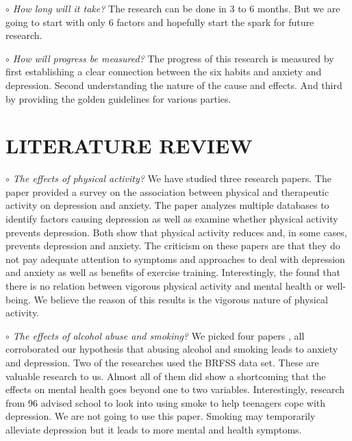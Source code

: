 \documentclass[letterpaper, 10 pt, conference]{ieeeconf}  %
\begin{document}
\par\noindent\textit{$\circ$ How long will it take?}\newline
\textnormal{
The research can be done in 3 to 6 months. But we are going to start
with only 6 factors and hopefully start the spark for future research. 
}
\par\noindent\textit{$\circ$ How will progress be measured?}\newline
\textnormal{
The progress of this research is measured by first establishing a clear connection 
between the six habits and anxiety and depression. Second understanding the nature of the cause and effects.
And third by providing the golden 
guidelines for various parties.
}

\setlength{\parskip}{.5em} %
\section{LITERATURE REVIEW}

\par\noindent\textit{$\circ$ The effects of physical activity?}\newline
We have studied three research papers.  
The \cite{strohle2009physical} paper provided a survey on the association 
between physical and therapeutic activity on depression and anxiety. 
The \cite{mammen2013physical} paper analyzes multiple databases to identify factors causing depression as 
well as examine whether physical activity prevents depression. Both show that
physical activity reduces and, in some cases, prevents depression and anxiety. 
The criticism on these papers are that they do not pay adequate attention to symptoms 
and approaches to deal with depression and anxiety as well as benefits of exercise training.
Interestingly, the \cite{van2013exploratory} found that there is no 
relation between vigorous physical activity and mental health or well-being. We believe 
the reason of this results is the vigorous nature of physical activity. 

\setlength{\parskip}{1em} %

\par\noindent\textit{$\circ$ The effects of alcohol abuse and smoking?}\newline
We picked four papers \cite{jia2018associations}\cite{strine2008depression}\cite{allan2015effects}\cite{patton1996smoking}
, all corroborated our hypothesis that abusing alcohol and smoking leads to anxiety and depression. Two of the 
researches used the BRFSS data set. These are valuable research to us. Almost all of them did show a shortcoming that 
the effects on mental health goes beyond one to two variables. Interestingly, research \cite{patton1996smoking}  
from 96 advised school to look into using smoke to help teenagers cope with depression. We are not going to use this paper. 
Smoking may temporarily alleviate depression but it leads to more mental and health symptoms. 
\end{document}
